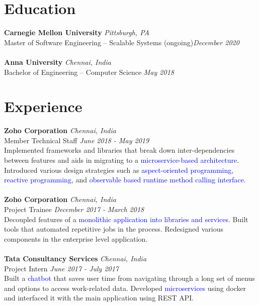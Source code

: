 \documentclass{resume}
\author{https://aravindvasu.dev}{Aravind Vasudevan}
\begin{document}
\maketitle
\section*{Education}
\noindent
\textbf{Carnegie Mellon University} \hfill \textit{Pittsburgh, PA} \\
{\small Master of Software Engineering -- Scalable Systems} (ongoing)\hfill \textit{\small December 2020}  \\
\\
\textbf{Anna University} \hfill \textit{Chennai, India} \\
{\small Bachelor of Engineering -- Computer Science} \hfill \textit{\small May 2018}  \\

\section*{Experience}
\noindent
\textbf{Zoho Corporation} \hfill \textit{Chennai, India} \\
{\small Member Technical Staff} \hfill \textit{\small June 2018 - May 2019}  \\
Implemented frameworks and libraries that break down inter-dependencies between features and aids in migrating to a \textcolor{blue}{microservice-based architecture}. Introduced various design strategies such as \textcolor{blue}{aspect-oriented programming,} \textcolor{blue}{reactive programming}, and \textcolor{blue}{observable based runtime method calling interface}.\\
\\
\textbf{Zoho Corporation} \hfill \textit{Chennai, India} \\
{\small Project Trainee} \hfill \textit{\small December 2017 - March 2018}  \\
Decoupled features of a \textcolor{blue}{monolithic application into libraries and services}. Built tools that automated repetitive jobs in the process. Redesigned various components in the enterprise level application.\\
\\
\textbf{Tata Consultancy Services} \hfill \textit{Chennai, India} \\
{\small Project Intern} \hfill \textit{\small June 2017 - July 2017}  \\
Built a \textcolor{blue}{chatbot} that saves user time from navigating through a long set of menus and options to access work-related data. Developed \textcolor{blue}{microservices} using docker and interfaced it with the main application using REST API.
\end{document}
